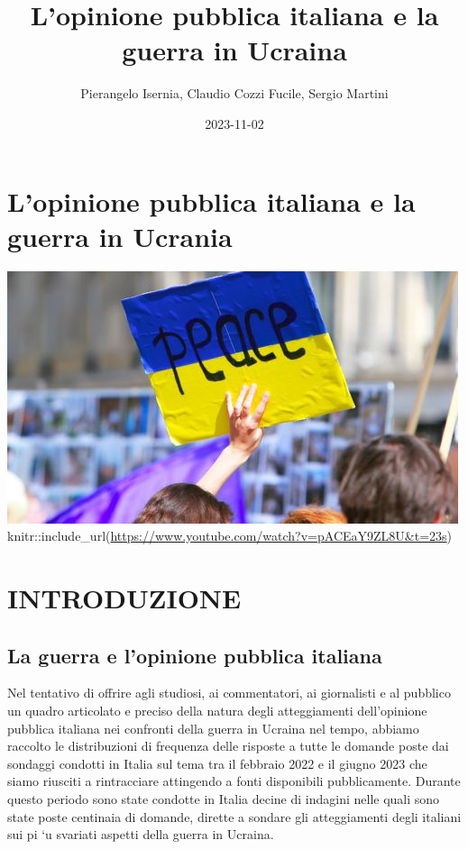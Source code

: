 \documentclass[
  openany]{book}
\title{L'opinione pubblica italiana e la guerra in Ucraina}
\author{Pierangelo Isernia, Claudio Cozzi Fucile, Sergio Martini}
\date{2023-11-02}
\begin{document}
\maketitle

{
\setcounter{tocdepth}{1}
\tableofcontents
}
\hypertarget{lopinione-pubblica-italiana-e-la-guerra-in-ucrania}{%
\chapter*{L'opinione pubblica italiana e la guerra in Ucrania}\label{lopinione-pubblica-italiana-e-la-guerra-in-ucrania}}

\includegraphics{Images/Ucrania.jpeg}
knitr::include\_url(\url{https://www.youtube.com/watch?v=pACEaY9ZL8U&t=23s})

\hypertarget{introduzione}{%
\chapter{INTRODUZIONE}\label{introduzione}}

\hypertarget{la-guerra-e-lopinione-pubblica-italiana}{%
\section{La guerra e l'opinione pubblica italiana}\label{la-guerra-e-lopinione-pubblica-italiana}}

Nel tentativo di offrire agli studiosi, ai commentatori, ai giornalisti e al pubblico un
quadro articolato e preciso della natura degli atteggiamenti dell'opinione pubblica italiana
nei confronti della guerra in Ucraina nel tempo, abbiamo raccolto le distribuzioni
di frequenza delle risposte a tutte le domande poste dai sondaggi condotti in Italia sul
tema tra il febbraio 2022 e il giugno 2023 che siamo riusciti a rintracciare attingendo a
fonti disponibili pubblicamente. Durante questo periodo sono state condotte in Italia
decine di indagini nelle quali sono state poste centinaia di domande, dirette a sondare
gli atteggiamenti degli italiani sui pi `u svariati aspetti della guerra in Ucraina.
\end{document}
